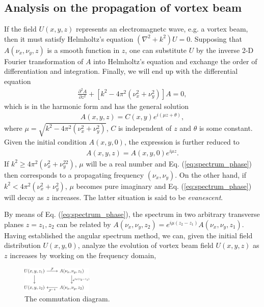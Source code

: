 \subsection{Analysis on the propagation of vortex beam}
If the field $U(x, y, z)$ represents an electromagnetc wave, e.g. a vortex beam, then it must satisfy Helmholtz's equation $(\nabla^2 + k^2) U  = 0$. Supposing that $A(\nu_x, \nu_y, z)$ is a smooth function in $z$, one can substitute $U$ by the inverse 2-D Fourier transformation of $A$ into Helmholtz's equation and exchange the order of differentiation and integration. Finally, we will end up with the differential equation
\begin{eqnarray}
	\frac{\partial^2 A}{\partial z^2} + \left[ k^2 - 4\pi^2\left( \nu_x^2 + \nu_y^2 \right) \right] A= 0,
	\nonumber
\end{eqnarray}
which is in the harmonic form and has the general solution
\begin{eqnarray}
	A(x, y, z) = C(x, y) e^{i (\mu z + \theta)},
	\nonumber
\end{eqnarray}
where $\mu = \sqrt{k^2 - 4\pi^2\left( \nu_x^2 + \nu_y^2 \right)}$, $C$ is independent of $z$ and $\theta$ is some constant. Given the initial condition $A(x, y, 0)$, the expression is further reduced to
\begin{eqnarray}
	A(x, y, z) = A(x, y, 0) e^{i \mu z}.
	\label{eq:spectrum_phase}
\end{eqnarray}
If $k^2 \ge 4\pi^2 (\nu_x^2 + \nu_y^22)$, $\mu$ will be a real number and Eq. (\ref{eq:spectrum_phase}) then corresponds to a propagating frequency $(\nu_x, \nu_y)$. On the other hand, if $k^2 < 4\pi^2 (\nu_x^2 + \nu_y^2)$, $\mu$ becomes pure imaginary and Eq. (\ref{eq:spectrum_phase}) will decay as $z$ increases. The latter situation is said to be {\em evanescent}.

By means of Eq. (\ref{eq:spectrum_phase}), the spectrum in two arbitrary transverse planes $z = z_1, z_2$ can be related by $A(\nu_x, \nu_y, z_2) = e^{i \mu (z_2 - z_1)} A(\nu_x, \nu_y, z_1)$. Having established the angular spectrum method, we can, given the initial field distribution $U(x, y, 0)$, analyze the evolution of vortex beam field $U(x, y, z)$ as $z$ increases by working on the frequency domain,

\begin{figure}
	\centering
	\includegraphics[width = 0.3\textwidth]{cd.jpg}
	\caption{The commutation diagram.}
	\label{fig:commu_diag}
\end{figure}

